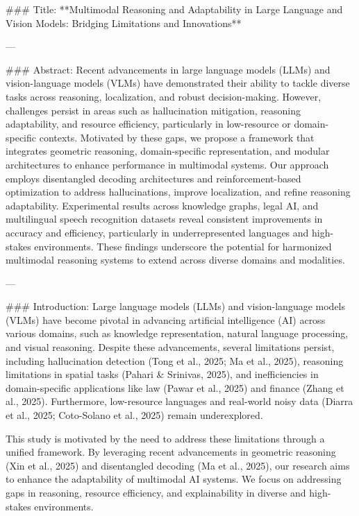 ### Title:
**Multimodal Reasoning and Adaptability in Large Language and Vision Models: Bridging Limitations and Innovations**

---

### Abstract:
Recent advancements in large language models (LLMs) and vision-language models (VLMs) have demonstrated their ability to tackle diverse tasks across reasoning, localization, and robust decision-making. However, challenges persist in areas such as hallucination mitigation, reasoning adaptability, and resource efficiency, particularly in low-resource or domain-specific contexts. Motivated by these gaps, we propose a framework that integrates geometric reasoning, domain-specific representation, and modular architectures to enhance performance in multimodal systems. Our approach employs disentangled decoding architectures and reinforcement-based optimization to address hallucinations, improve localization, and refine reasoning adaptability. Experimental results across knowledge graphs, legal AI, and multilingual speech recognition datasets reveal consistent improvements in accuracy and efficiency, particularly in underrepresented languages and high-stakes environments. These findings underscore the potential for harmonized multimodal reasoning systems to extend across diverse domains and modalities.

---

### Introduction:
Large language models (LLMs) and vision-language models (VLMs) have become pivotal in advancing artificial intelligence (AI) across various domains, such as knowledge representation, natural language processing, and visual reasoning. Despite these advancements, several limitations persist, including hallucination detection (Tong et al., 2025; Ma et al., 2025), reasoning limitations in spatial tasks (Pahari & Srinivas, 2025), and inefficiencies in domain-specific applications like law (Pawar et al., 2025) and finance (Zhang et al., 2025). Furthermore, low-resource languages and real-world noisy data (Diarra et al., 2025; Coto-Solano et al., 2025) remain underexplored.

This study is motivated by the need to address these limitations through a unified framework. By leveraging recent advancements in geometric reasoning (Xin et al., 2025) and disentangled decoding (Ma et al., 2025), our research aims to enhance the adaptability of multimodal AI systems. We focus on addressing gaps in reasoning, resource efficiency, and explainability in diverse and high-stakes environments.

